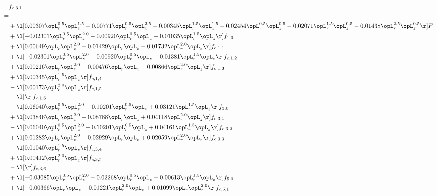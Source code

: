 \begin{alignat}{2} 
\label{eq:f_31_1} 
& f_{c,3,1} \nonumber \\ 
 = \\ 
& + \l[  0.00307 \opL_r^{0.5} \opL_z^{1.5} +  0.00771 \opL_r^{0.5} \opL_z^{2.5}   -0.00345 \opL_r^{1.5} \opL_z^{1.5}   -0.02454 \opL_r^{0.5} \opL_z^{0.5}   -0.02071 \opL_r^{1.5} \opL_z^{0.5}   -0.01438 \opL_r^{2.5} \opL_z^{0.5}  \r] F \nonumber \\ 
& + \l[  -0.02301 \opL_r^{0.5} \opL_z^{2.0}   -0.00920 \opL_r^{0.5} \opL_z +  0.01035 \opL_r^{1.5} \opL_z  \r] f_{1,0} \nonumber \\ 
& + \l[  0.00649 \opL_r \opL_z^{2.0}   -0.01429 \opL_r \opL_z   -0.01732 \opL_r^{2.0} \opL_z  \r] f_{c,1,1} \nonumber \\ 
& + \l[  -0.02301 \opL_r^{0.5} \opL_z^{2.0}   -0.00920 \opL_r^{0.5} \opL_z +  0.01381 \opL_r^{1.5} \opL_z  \r] f_{c,1,2} \nonumber \\ 
& + \l[  0.00216 \opL_r \opL_z^{2.0}   -0.00476 \opL_r \opL_z   -0.00866 \opL_r^{2.0} \opL_z  \r] f_{c,1,3} \nonumber \\ 
& + \l[  0.00345 \opL_r^{1.5} \opL_z  \r] f_{c,1,4} \nonumber \\ 
& - \l[  0.00173 \opL_r^{2.0} \opL_z  \r] f_{c,1,5} \nonumber \\ 
& - \l[  \r] f_{c,1,6} \nonumber \\ 
& - \l[  0.06040 \opL_r^{0.5} \opL_z^{2.0} +  0.10201 \opL_r^{0.5} \opL_z +  0.03121 \opL_r^{1.5} \opL_z  \r] f_{3,0} \nonumber \\ 
& + \l[  0.03846 \opL_r \opL_z^{2.0} +  0.08788 \opL_r \opL_z +  0.04118 \opL_r^{2.0} \opL_z  \r] f_{c,3,1} \nonumber \\ 
& - \l[  0.06040 \opL_r^{0.5} \opL_z^{2.0} +  0.10201 \opL_r^{0.5} \opL_z +  0.04161 \opL_r^{1.5} \opL_z  \r] f_{c,3,2} \nonumber \\ 
& + \l[  0.01282 \opL_r \opL_z^{2.0} +  0.02929 \opL_r \opL_z +  0.02059 \opL_r^{2.0} \opL_z  \r] f_{c,3,3} \nonumber \\ 
& - \l[  0.01040 \opL_r^{1.5} \opL_z  \r] f_{c,3,4} \nonumber \\ 
& + \l[  0.00412 \opL_r^{2.0} \opL_z  \r] f_{c,3,5} \nonumber \\ 
& - \l[  \r] f_{c,3,6} \nonumber \\ 
& + \l[  -0.03085 \opL_r^{0.5} \opL_z^{2.0}   -0.02268 \opL_r^{0.5} \opL_z +  0.00613 \opL_r^{1.5} \opL_z  \r] f_{5,0} \nonumber \\ 
& + \l[  -0.00366 \opL_r \opL_z   -0.01221 \opL_r^{2.0} \opL_z +  0.01099 \opL_r \opL_z^{2.0}  \r] f_{c,5,1} \nonumber \\ 

\end{alignat}
